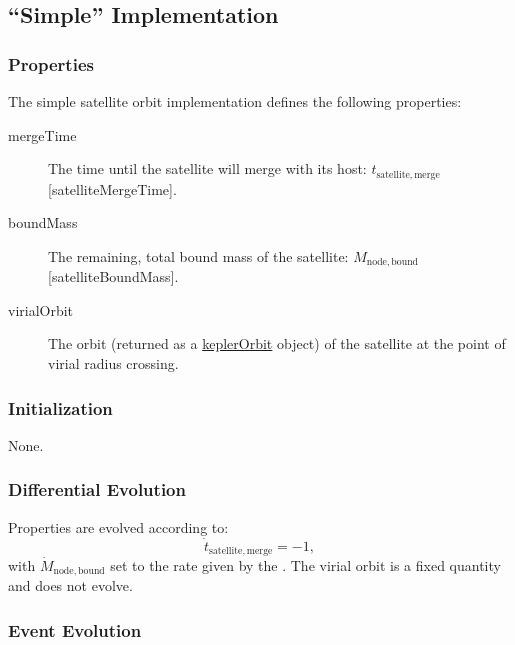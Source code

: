 \subsection{``Simple'' Implementation}\label{sec:SatelliteOrbitComponentSimple}

\subsubsection{Properties}

The simple satellite orbit implementation defines the following properties:
\begin{description}
 \item [{\normalfont \ttfamily mergeTime}] The time until the satellite will merge with its host: $t_\mathrm{satellite, merge}$ [{\normalfont \ttfamily satelliteMergeTime}].
 \item [{\normalfont \ttfamily boundMass}] The remaining, total bound mass of the satellite: $M_\mathrm{node,bound}$ [{\normalfont \ttfamily satelliteBoundMass}].
 \item[{\normalfont \ttfamily virialOrbit}] The orbit (returned as a \href{https://github.com/galacticusorg/galacticus/releases/download/masterRelease/Galacticus_Development.pdf\#sec.KeplerOrbits}{\normalfont \ttfamily keplerOrbit} object) of the satellite at the point of virial radius crossing.
\end{description}

\subsubsection{Initialization}

None.

\subsubsection{Differential Evolution}

Properties are evolved according to:
\begin{equation}
 \dot{t}_\mathrm{satellite, merge} = -1,
\end{equation}
with $\dot{M}_\mathrm{node,bound}$ set to the rate given by the . The virial orbit is a fixed quantity and does not evolve.

\subsubsection{Event Evolution}

